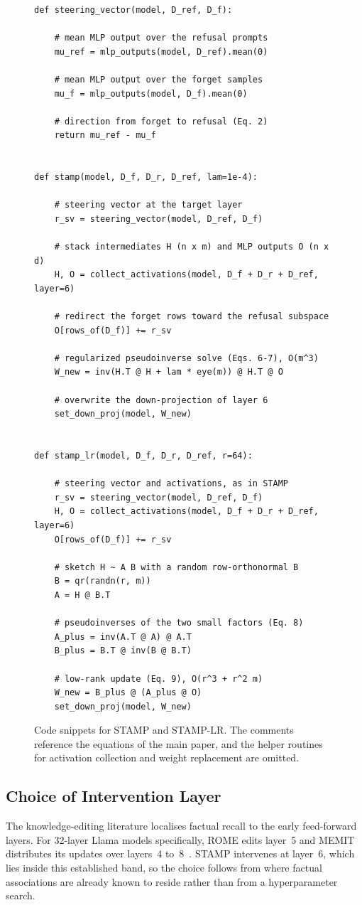 \begin{figure}[!tb]
\captionsetup{name=Listing, labelsep=bar}
\begin{lstlisting}[style=snippet]
def steering_vector(model, D_ref, D_f):

    # mean MLP output over the refusal prompts
    mu_ref = mlp_outputs(model, D_ref).mean(0)

    # mean MLP output over the forget samples
    mu_f = mlp_outputs(model, D_f).mean(0)

    # direction from forget to refusal (Eq. 2)
    return mu_ref - mu_f


def stamp(model, D_f, D_r, D_ref, lam=1e-4):

    # steering vector at the target layer
    r_sv = steering_vector(model, D_ref, D_f)

    # stack intermediates H (n x m) and MLP outputs O (n x d)
    H, O = collect_activations(model, D_f + D_r + D_ref, layer=6)

    # redirect the forget rows toward the refusal subspace
    O[rows_of(D_f)] += r_sv

    # regularized pseudoinverse solve (Eqs. 6-7), O(m^3)
    W_new = inv(H.T @ H + lam * eye(m)) @ H.T @ O

    # overwrite the down-projection of layer 6
    set_down_proj(model, W_new)


def stamp_lr(model, D_f, D_r, D_ref, r=64):

    # steering vector and activations, as in STAMP
    r_sv = steering_vector(model, D_ref, D_f)
    H, O = collect_activations(model, D_f + D_r + D_ref, layer=6)
    O[rows_of(D_f)] += r_sv

    # sketch H ~ A B with a random row-orthonormal B
    B = qr(randn(r, m))
    A = H @ B.T

    # pseudoinverses of the two small factors (Eq. 8)
    A_plus = inv(A.T @ A) @ A.T
    B_plus = B.T @ inv(B @ B.T)

    # low-rank update (Eq. 9), O(r^3 + r^2 m)
    W_new = B_plus @ (A_plus @ O)
    set_down_proj(model, W_new)
\end{lstlisting}
\caption{Code snippets for STAMP and STAMP-LR. The comments reference the equations of the main paper, and the helper routines for activation collection and weight replacement are omitted.}
\label{fig:stamp_code}
\end{figure}



\subsection{Choice of Intervention Layer}
\label{sup:layer}
\label{sec:layer_analysis}
The knowledge-editing literature localises factual recall to the early feed-forward layers. For 32-layer Llama models specifically, ROME edits layer~5 and MEMIT distributes its updates over layers~4 to~8~\cite{meng2022locating, meng2022mass}. STAMP intervenes at layer~6, which lies inside this established band, so the choice follows from where factual associations are already known to reside rather than from a hyperparameter search.

